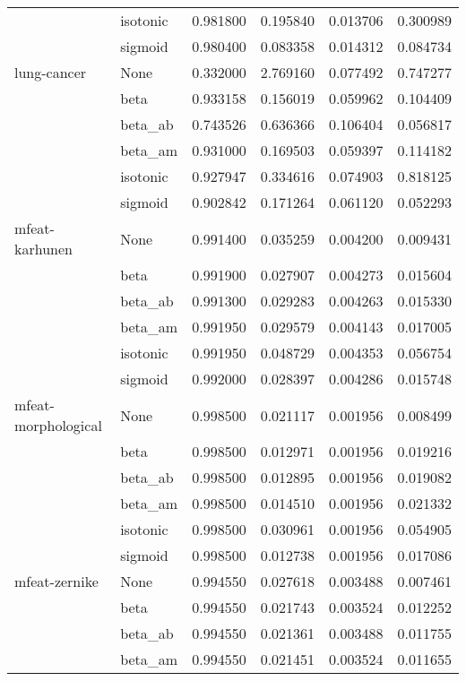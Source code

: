 \begin{tabular}{llrrrr}
        & isotonic &  0.981800 &  0.195840 &  0.013706 &  0.300989 \\
        & sigmoid &  0.980400 &  0.083358 &  0.014312 &  0.084734 \\
lung-cancer & None &  0.332000 &  2.769160 &  0.077492 &  0.747277 \\
        & beta &  0.933158 &  0.156019 &  0.059962 &  0.104409 \\
        & beta\_ab &  0.743526 &  0.636366 &  0.106404 &  0.056817 \\
        & beta\_am &  0.931000 &  0.169503 &  0.059397 &  0.114182 \\
        & isotonic &  0.927947 &  0.334616 &  0.074903 &  0.818125 \\
        & sigmoid &  0.902842 &  0.171264 &  0.061120 &  0.052293 \\
mfeat-karhunen & None &  0.991400 &  0.035259 &  0.004200 &  0.009431 \\
        & beta &  0.991900 &  0.027907 &  0.004273 &  0.015604 \\
        & beta\_ab &  0.991300 &  0.029283 &  0.004263 &  0.015330 \\
        & beta\_am &  0.991950 &  0.029579 &  0.004143 &  0.017005 \\
        & isotonic &  0.991950 &  0.048729 &  0.004353 &  0.056754 \\
        & sigmoid &  0.992000 &  0.028397 &  0.004286 &  0.015748 \\
mfeat-morphological & None &  0.998500 &  0.021117 &  0.001956 &  0.008499 \\
        & beta &  0.998500 &  0.012971 &  0.001956 &  0.019216 \\
        & beta\_ab &  0.998500 &  0.012895 &  0.001956 &  0.019082 \\
        & beta\_am &  0.998500 &  0.014510 &  0.001956 &  0.021332 \\
        & isotonic &  0.998500 &  0.030961 &  0.001956 &  0.054905 \\
        & sigmoid &  0.998500 &  0.012738 &  0.001956 &  0.017086 \\
mfeat-zernike & None &  0.994550 &  0.027618 &  0.003488 &  0.007461 \\
        & beta &  0.994550 &  0.021743 &  0.003524 &  0.012252 \\
        & beta\_ab &  0.994550 &  0.021361 &  0.003488 &  0.011755 \\
        & beta\_am &  0.994550 &  0.021451 &  0.003524 &  0.011655 \\

\end{tabular}
